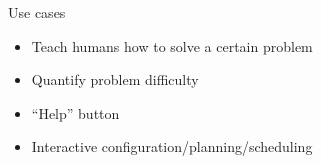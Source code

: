 \documentclass[12pt,aspectratio=169]{beamer}
\begin{document}
% 
% 
% 
% 




\begin{frame}{Use cases}
 \begin{itemize}
  \item Teach humans how to solve a certain problem
  \item Quantify problem difficulty
  \item ``Help'' button
  \item Interactive configuration/planning/scheduling
 \end{itemize}

\end{frame}
\end{document}
